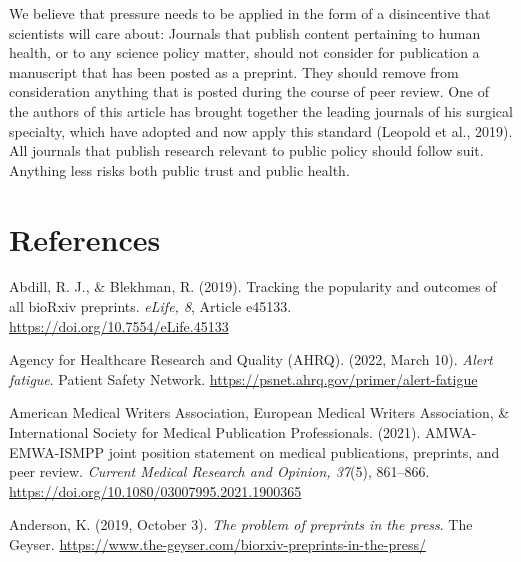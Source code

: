 \documentclass[authordate, perspective]{jote-new-article}
\begin{document}
	We believe that pressure needs to be applied in the form of a disincentive that scientists will care about: Journals that publish content pertaining to human health, or to any science policy matter, should not consider for publication a manuscript that has been posted as a preprint. They should remove from consideration anything that is posted during the course of peer review. One of the authors of this article has brought together the leading journals of his surgical specialty, which have adopted and now apply this standard (Leopold et al., 2019). All journals that publish research relevant to public policy should follow suit. Anything less risks both public trust and public health.











	\section{References}







	Abdill, R. J., \& Blekhman, R. (2019). Tracking the popularity and outcomes of all bioRxiv preprints. \emph{eLife, 8}, Article e45133. \url{https://doi.org/10.7554/eLife.45133}







	Agency for Healthcare Research and Quality (AHRQ). (2022, March 10). \emph{Alert fatigue}. Patient Safety Network. \url{https://psnet.ahrq.gov/primer/alert-fatigue}







	American Medical Writers Association, European Medical Writers Association, \& International Society for Medical Publication Professionals. (2021). AMWA-EMWA-ISMPP joint position statement on medical publications, preprints, and peer review. \emph{Current Medical Research and Opinion, 37}(5), 861--866. \url{https://doi.org/10.1080/03007995.2021.1900365}







	Anderson, K. (2019, October 3). \emph{The problem of preprints in the press}. The Geyser. \url{https://www.the-geyser.com/biorxiv-preprints-in-the-press/}
\end{document}

